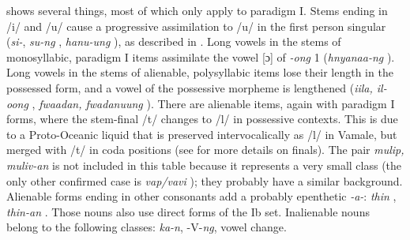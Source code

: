  shows several things, most of which only apply to paradigm I. Stems ending in /i/ and /u/ cause a progressive assimilation to /u/ in the first person singular (\textit{si-}, \textit{su-ng} , \textit{hanu-ung} ), as described in . Long vowels in the stems of monosyllabic, paradigm I items assimilate the vowel {[ɔ]} of \textit{-ong} 1 (\textit{hnyanaa-ng} ). Long vowels in the stems of alienable, polysyllabic items lose their length in the possessed form, and a vowel of the possessive morpheme is lengthened (\textit{iila, il-oong} , \textit{fwaadan, fwadanuung} ). There are alienable items, again with paradigm I forms, where the stem-final /t/ changes to /l/ in possessive contexts. This is due to a Proto-Oceanic liquid that is preserved intervocalically as /l/ in Vamale, but merged with /t/ in coda positions (see  for more details on finals). The pair \textit{mulip, muliv-an}  is not included in this table because it represents a very small class (the only other confirmed case is \textit{vap\slash vavi} ); they probably have a similar background. Alienable forms ending in other consonants add a probably epenthetic \textit{-a-}: \textit{thin} , \textit{thin-an} . Those nouns also use direct forms of the Ib set.
Inalienable nouns belong to the following classes: \textit{ka-n}, -V-\textit{ng}, vowel change. 




